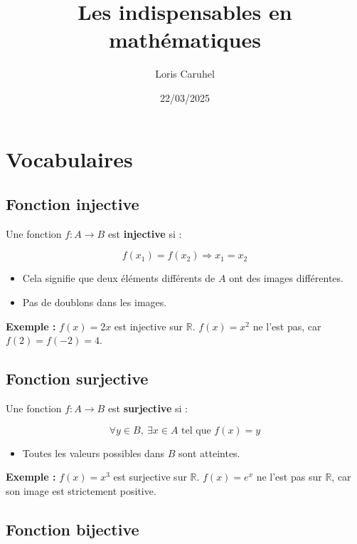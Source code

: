 \documentclass[12]{article}%
\title{\LARGE\textbf{Les indispensables en mathématiques}}
\author{Loris Caruhel}
\date{22/03/2025}
\theoremstyle{plain}
\theoremstyle{definition}
\theoremstyle{remark}
\begin{document}
\maketitle
\newpage

\large
\tableofcontents

\newpage
\section{Vocabulaires}
\subsection*{Fonction injective}

Une fonction \( f : A \to B \) est \textbf{injective} si :

\[
f(x_1) = f(x_2) \Rightarrow x_1 = x_2
\]

\begin{itemize}[label=--]
	\item Cela signifie que deux éléments différents de \( A \) ont des images différentes.
	\item Pas de doublons dans les images.
\end{itemize}

\textbf{Exemple :} \( f(x) = 2x \) est injective sur \( \mathbb{R} \).  
\( f(x) = x^2 \) ne l'est pas, car \( f(2) = f(-2) = 4 \).

\vspace{0.5cm}

\subsection*{Fonction surjective}

Une fonction \( f : A \to B \) est \textbf{surjective} si :

\[
\forall y \in B, \ \exists x \in A \text{ tel que } f(x) = y
\]

\begin{itemize}[label=--]
	\item Toutes les valeurs possibles dans \( B \) sont atteintes.
\end{itemize}

\textbf{Exemple :} \( f(x) = x^3 \) est surjective sur \( \mathbb{R} \).  
\( f(x) = e^x \) ne l'est pas sur \( \mathbb{R} \), car son image est strictement positive.

\vspace{0.5cm}

\subsection*{Fonction bijective}
\end{document}
